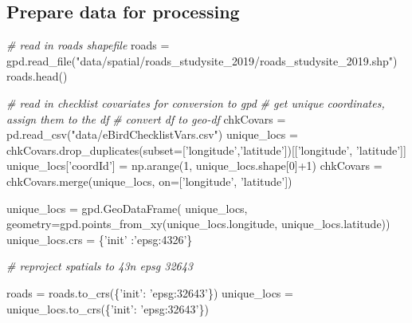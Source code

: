 \documentclass[]{article}
\newenvironment{Shaded}{}{}
\newcommand{\CommentTok}[1]{\textcolor[rgb]{0.38,0.63,0.69}{\textit{#1}}}
\newcommand{\DecValTok}[1]{\textcolor[rgb]{0.25,0.63,0.44}{#1}}
\newcommand{\NormalTok}[1]{#1}
\newcommand{\OperatorTok}[1]{\textcolor[rgb]{0.40,0.40,0.40}{#1}}
\newcommand{\StringTok}[1]{\textcolor[rgb]{0.25,0.44,0.63}{#1}}
\begin{document}
\hypertarget{prepare-data-for-processing}{%
\subsection{Prepare data for processing}\label{prepare-data-for-processing}}

\begin{Shaded}
\begin{Highlighting}[]
\CommentTok{# read in roads shapefile}
\NormalTok{roads }\OperatorTok{=}\NormalTok{ gpd.read_file(}\StringTok{"data/spatial/roads_studysite_2019/roads_studysite_2019.shp"}\NormalTok{)}
\NormalTok{roads.head()}

\CommentTok{# read in checklist covariates for conversion to gpd}
\CommentTok{# get unique coordinates, assign them to the df}
\CommentTok{# convert df to geo-df}
\NormalTok{chkCovars }\OperatorTok{=}\NormalTok{ pd.read_csv(}\StringTok{"data/eBirdChecklistVars.csv"}\NormalTok{)}
\NormalTok{unique_locs }\OperatorTok{=}\NormalTok{ chkCovars.drop_duplicates(subset}\OperatorTok{=}\NormalTok{[}\StringTok{'longitude'}\NormalTok{,}\StringTok{'latitude'}\NormalTok{])[[}\StringTok{'longitude'}\NormalTok{, }\StringTok{'latitude'}\NormalTok{]]}
\NormalTok{unique_locs[}\StringTok{'coordId'}\NormalTok{] }\OperatorTok{=}\NormalTok{ np.arange(}\DecValTok{1}\NormalTok{, unique_locs.shape[}\DecValTok{0}\NormalTok{]}\OperatorTok{+}\DecValTok{1}\NormalTok{)}
\NormalTok{chkCovars }\OperatorTok{=}\NormalTok{ chkCovars.merge(unique_locs, on}\OperatorTok{=}\NormalTok{[}\StringTok{'longitude'}\NormalTok{, }\StringTok{'latitude'}\NormalTok{])}

\NormalTok{unique_locs }\OperatorTok{=}\NormalTok{ gpd.GeoDataFrame(}
\NormalTok{unique_locs,}
\NormalTok{geometry}\OperatorTok{=}\NormalTok{gpd.points_from_xy(unique_locs.longitude, unique_locs.latitude))}
\NormalTok{unique_locs.crs }\OperatorTok{=}\NormalTok{ \{}\StringTok{'init'}\NormalTok{ :}\StringTok{'epsg:4326'}\NormalTok{\}}

\CommentTok{# reproject spatials to 43n epsg 32643}

\NormalTok{roads }\OperatorTok{=}\NormalTok{ roads.to_crs(\{}\StringTok{'init'}\NormalTok{: }\StringTok{'epsg:32643'}\NormalTok{\})}
\NormalTok{unique_locs }\OperatorTok{=}\NormalTok{ unique_locs.to_crs(\{}\StringTok{'init'}\NormalTok{: }\StringTok{'epsg:32643'}\NormalTok{\})}



\end{Highlighting}
\end{Shaded}
\end{document}

